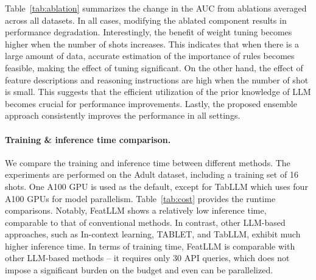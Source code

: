 Table~\ref{tab:ablation} summarizes the change in the AUC from ablations averaged across all datasets. In all cases, modifying the ablated component results in performance degradation. Interestingly, the benefit of weight tuning becomes higher when the number of shots increases. This indicates that when there is a large amount of data, accurate estimation of the importance of rules becomes feasible, making the effect of tuning significant. On the other hand, the effect of feature descriptions and reasoning instructions are high when the number of shot is small. This suggests that the efficient utilization of the prior knowledge of LLM becomes crucial for performance improvements. Lastly, the proposed ensemble approach consistently improves the performance in all settings.

\begin{table}[h!]
\centering

\caption{Ablation study summaries. Averaged changes of AUC with standard error after altering or omitting modules over 13 datasets with three different trials are reported.}
\label{tab:ablation}
\end{table}

\vspace*{-0.12in}
\paragraph{Training \& inference time comparison.} We compare the training and inference time between different methods. The experiments are performed on the Adult dataset, including a training set of 16 shots. One A100 GPU is used as the default, except for TabLLM which uses four A100 GPUs for model parallelism. Table~\ref{tab:cost} provides the runtime comparisons. Notably, \textsf{FeatLLM} shows a relatively low inference time, comparable to that of conventional methods. In contrast, other LLM-based approaches, such as In-context learning, TABLET, and TabLLM, exhibit much higher inference time. In terms of training time, \textsf{FeatLLM} is comparable with other LLM-based methods -- it requires only 30 API queries, which does not impose a significant burden on the budget and even can be parallelized.


